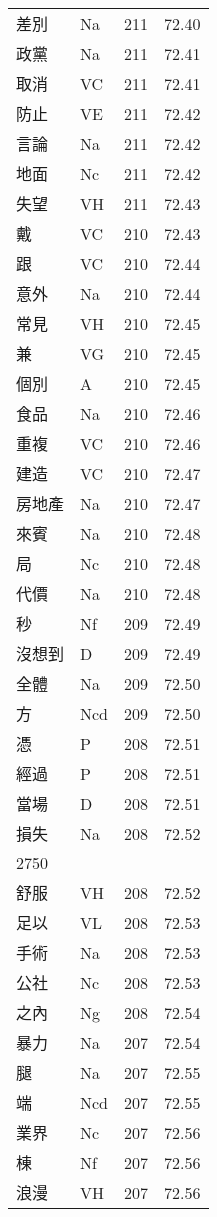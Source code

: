 \documentclass[twocolumn]{book}
\begin{document}
\begin{supertabular}{llrr}
差別 & Na & 211 &  72.40\\
政黨 & Na & 211 &  72.41\\
取消 & VC & 211 &  72.41\\
防止 & VE & 211 &  72.42\\
言論 & Na & 211 &  72.42\\
地面 & Nc & 211 &  72.42\\
失望 & VH & 211 &  72.43\\
戴 & VC & 210 &  72.43\\
跟 & VC & 210 &  72.44\\
意外 & Na & 210 &  72.44\\
常見 & VH & 210 &  72.45\\
兼 & VG & 210 &  72.45\\
個別 & A & 210 &  72.45\\
食品 & Na & 210 &  72.46\\
重複 & VC & 210 &  72.46\\
建造 & VC & 210 &  72.47\\
房地產 & Na & 210 &  72.47\\
來賓 & Na & 210 &  72.48\\
局 & Nc & 210 &  72.48\\
代價 & Na & 210 &  72.48\\
秒 & Nf & 209 &  72.49\\
沒想到 & D & 209 &  72.49\\
全體 & Na & 209 &  72.50\\
方 & Ncd & 209 &  72.50\\
憑 & P & 208 &  72.51\\
經過 & P & 208 &  72.51\\
當場 & D & 208 &  72.51\\
損失 & Na & 208 &  72.52\\
2750\\
舒服 & VH & 208 &  72.52\\
足以 & VL & 208 &  72.53\\
手術 & Na & 208 &  72.53\\
公社 & Nc & 208 &  72.53\\
之內 & Ng & 208 &  72.54\\
暴力 & Na & 207 &  72.54\\
腿 & Na & 207 &  72.55\\
端 & Ncd & 207 &  72.55\\
業界 & Nc & 207 &  72.56\\
棟 & Nf & 207 &  72.56\\
浪漫 & VH & 207 &  72.56\\

\end{supertabular}
\end{document}
